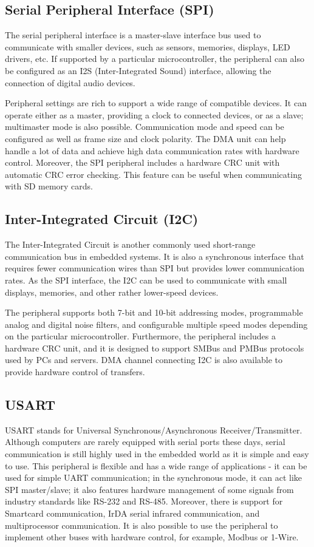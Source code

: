 	\subsection{Serial Peripheral Interface (SPI)}
	\label{sub:spi}
The serial peripheral interface is a master-slave interface bus used to communicate with smaller devices, such as sensors, memories, displays, LED drivers, etc. If supported by a particular microcontroller, the peripheral can also be configured as an I2S (Inter-Integrated Sound) interface, allowing the connection of digital audio devices.

Peripheral settings are rich to support a wide range of compatible devices. It can operate either as a master, providing a clock to connected devices, or as a slave; multimaster mode is also possible. Communication mode and speed can be configured as well as frame size and clock polarity. The DMA unit can help handle a lot of data and achieve high data communication rates with hardware control. Moreover, the SPI peripheral includes a hardware CRC unit with automatic CRC error checking. This feature can be useful when communicating with SD memory cards.

	\subsection{Inter-Integrated Circuit (I2C)}
	\label{sub:i2c}
The Inter-Integrated Circuit is another commonly used short-range communication bus in embedded systems. It is also a synchronous interface that requires fewer communication wires than SPI but provides lower communication rates. As the SPI interface, the I2C can be used to communicate with small displays, memories, and other rather lower-speed devices.

The peripheral supports both 7-bit and 10-bit addressing modes, programmable analog and digital noise filters, and configurable multiple speed modes depending on the particular microcontroller. Furthermore, the peripheral includes a hardware CRC unit, and it is designed to support SMBus and PMBus protocols used by PCs and servers. DMA channel connecting I2C is also available to provide hardware control of transfers.

	\subsection{USART}
	\label{sub:usart}
USART stands for Universal Synchronous/Asynchronous Receiver/Transmitter. Although computers are rarely equipped with serial ports these days, serial communication is still highly used in the embedded world as it is simple and easy to use. This peripheral is flexible and has a wide range of applications - it can be used for simple UART communication; in the synchronous mode, it can act like SPI master/slave; it also features hardware management of some signals from industry standards like RS-232 and RS-485. Moreover, there is support for Smartcard communication, IrDA serial infrared communication, and multiprocessor communication. It is also possible to use the peripheral to implement other buses with hardware control, for example, Modbus or 1-Wire.  

